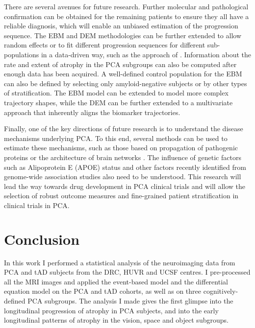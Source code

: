 There are several avenues for future research. Further molecular and pathological confirmation can be obtained for the remaining patients to ensure they all have a reliable diagnosis, which will enable an unbiased estimation of the progression sequence. The EBM and DEM methodologies can be further extended to allow random effects or to fit different progression sequences for different sub-populations in a data-driven way, such as the approach of \cite{young2015multiple}. Information about the rate and extent of atrophy in the PCA subgroups can also be computed after enough data has been acquired. A well-defined control population for the EBM can also be defined by selecting only amyloid-negative subjects or by other types of stratification. The EBM model can be extended to model more complex trajectory shapes, while the DEM can be further extended to a multivariate approach that inherently aligns the biomarker trajectories.

Finally, one of the key directions of future research is to understand the disease mechanisms underlying PCA. To this end, several methods can be used to estimate these mechanisms, such as those based on propagation of pathogenic proteins \cite{raj2012network, georgiadis2018computational} or the architecture of brain networks \cite{zhou2012predicting}. The influence of genetic factors such as Alipoprotein E (APOE) status \cite{schott2006apolipoprotein, snowden2007cognitive} and other factors recently identified \cite{schott2016genetic, schott2006apolipoprotein} from genome-wide association studies also need to be understood. This research will lead the way towards drug development in PCA clinical trials and will allow the selection of robust outcome measures and fine-grained patient stratification in clinical trials in PCA. 

\section{Conclusion}

In this work I performed a statistical analysis of the neuroimaging data from PCA and tAD subjects from the DRC, HUVR and UCSF centres. I pre-processed all the MRI images and applied the event-based model and the differential equation model on the PCA and tAD cohorts, as well as on three cognitively-defined PCA subgroups. The analysis I made gives the first glimpse into the longitudinal progression of atrophy in PCA subjects, and into the early longitudinal patterns of atrophy in the vision, space and object subgroups.

